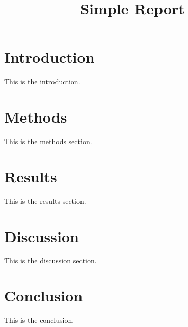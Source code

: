 \documentclass{report}
\title{Simple Report}
\author{}
\date{}
\begin{document}
	
	\maketitle
	
	\tableofcontents
	
	\chapter{Introduction}
	This is the introduction.
	
	\chapter{Methods}
	This is the methods section.
	
	\chapter{Results}
	This is the results section.
	
	\chapter{Discussion}
	This is the discussion section.
	
	\chapter{Conclusion}
	This is the conclusion.
	
\end{document}
